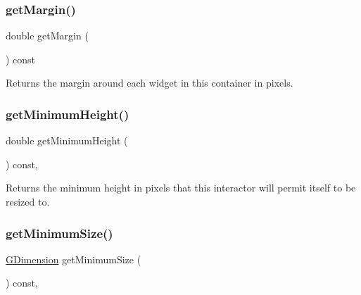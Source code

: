 \subsubsection{\texorpdfstring{get\+Margin()}{getMargin()}}
{\footnotesize\ttfamily double get\+Margin (\begin{DoxyParamCaption}{ }\end{DoxyParamCaption}) const\hspace{0.3cm}{\ttfamily [virtual]}}



Returns the margin around each widget in this container in pixels. 

\mbox{\label{classGInteractor_aed4b0075fcc434499c3cb3e46896bda3}} 
\subsubsection{\texorpdfstring{get\+Minimum\+Height()}{getMinimumHeight()}}
{\footnotesize\ttfamily double get\+Minimum\+Height (\begin{DoxyParamCaption}{ }\end{DoxyParamCaption}) const\hspace{0.3cm}{\ttfamily [virtual]}, {\ttfamily [inherited]}}



Returns the minimum height in pixels that this interactor will permit itself to be resized to. 

\mbox{\label{classGInteractor_a66b5af0b32493b4d597ca0a3df2049ea}} 
\subsubsection{\texorpdfstring{get\+Minimum\+Size()}{getMinimumSize()}}
{\footnotesize\ttfamily \mbox{\hyperlink{classGDimension}{G\+Dimension}} get\+Minimum\+Size (\begin{DoxyParamCaption}{ }\end{DoxyParamCaption}) const\hspace{0.3cm}{\ttfamily [virtual]}, {\ttfamily [inherited]}}



